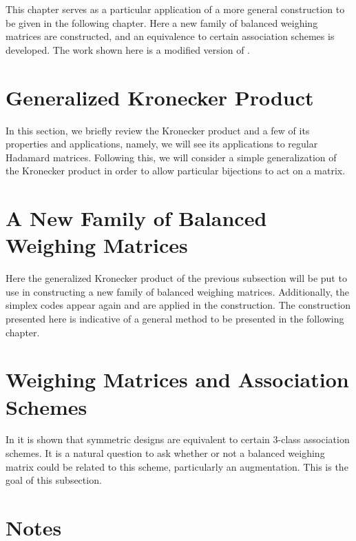\documentclass[../../main]{subfiles}
\begin{document}
This chapter serves as a particular application of a more general construction
to be given in the following chapter. Here a new family of balanced weighing
matrices are constructed, and an equivalence to certain association schemes is
developed. The work shown here is a modified version of \cite{new-bw}. 

 \section{\centering Generalized Kronecker Product}
 
 In this section, we briefly review the Kronecker product and a few of its properties and applications, namely, we will see its applications to regular Hadamard matrices. Following this, we will consider a simple generalization of the Kronecker product in order to allow particular bijections to act on a matrix.
 
 \dinkus
 
 
 
 \section{\centering A New Family of Balanced Weighing Matrices}
 
 Here the generalized Kronecker product of the previous subsection will be put to use in constructing a new family of balanced weighing matrices. Additionally, the simplex codes appear again and are applied in the construction. The construction presented here is indicative of a general method to be presented in the following chapter.
 
 \dinkus
 
 
 
 \section{\centering Weighing Matrices and Association Schemes}
 
 In \cite{distance-regular-graphs} it is shown that symmetric designs are equivalent to certain 3-class association schemes. It is a natural question to ask whether or not a balanced weighing matrix could be related to this scheme, particularly an augmentation. This is the goal of this subsection.
 
 \dinkus
 
 
 
 \singlespace
 
 \section*{\centering Notes}
 \theenotes
 
 \doublespacing
 
 \biblio
\end{document}
